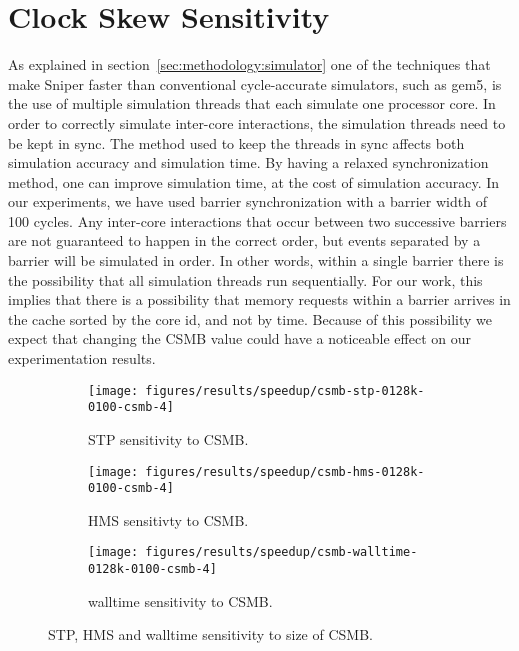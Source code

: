 
\section{Clock Skew Sensitivity}
\label{sec:results:csmb_sensitivity}

As explained in section~\ref{sec:methodology:simulator} one of the techniques that make Sniper faster than conventional cycle-accurate simulators, such as gem5, is the use of multiple simulation threads that each simulate one processor core.
In order to correctly simulate inter-core interactions, the simulation threads need to be kept in sync.
The method used to keep the threads in sync affects both simulation accuracy and simulation time.
By having a relaxed synchronization method, one can improve simulation time, at the cost of simulation accuracy.
In our experiments, we have used barrier synchronization with a barrier width of 100 cycles.
Any inter-core interactions that occur between two successive barriers are not guaranteed to happen in the correct order, but events separated by a barrier will be simulated in order.
In other words, within a single barrier there is the possibility that all simulation threads run sequentially.
For our work, this implies that there is a possibility that memory requests within a barrier arrives in the cache sorted by the core id, and not by time.
Because of this possibility we expect that changing the CSMB value could have a noticeable effect on our experimentation results.

\begin{figure}[!htb]
    \centering
    \begin{subfigure}[b]{0.5\textwidth}
        \texttt{[image: figures/results/speedup/csmb-stp-0128k-0100-csmb-4]}
        \caption{STP sensitivity to CSMB.}
        \label{fig:results:csmb:stp}
    \end{subfigure}%
    \begin{subfigure}[b]{0.5\textwidth}
        \texttt{[image: figures/results/speedup/csmb-hms-0128k-0100-csmb-4]}
        \caption{HMS sensitivty to CSMB.}
        \label{fig:results:csmb:hms}
    \end{subfigure}
    \begin{subfigure}[b]{0.6\textwidth}
        \texttt{[image: figures/results/speedup/csmb-walltime-0128k-0100-csmb-4]}
        \caption{walltime sensitivity to CSMB.}
        \label{fig:results:csmb:walltime}
    \end{subfigure}
    \caption{STP, HMS and walltime sensitivity to size of CSMB.}
    \label{fig:results:csmb}
\end{figure}


